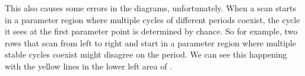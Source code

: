 This also causes some errors in the diagrams, unfortunately.
When a scan starts in a parameter region where multiple cycles of different periods coexist, the cycle it sees at the first parameter point is determined by chance.
So for example, two rows that scan from left to right and start in a parameter region where multiple stable cycles coexist might disagree on the period.
We can see this happening with the yellow lines in the lower left area of .
